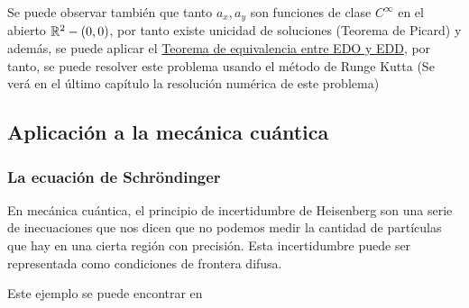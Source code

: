\begin{ejemplo}
	Se puede observar también que tanto $a_x, a_y$ son funciones de clase $C^\infty$ en el abierto $\mathbb R^2 - (0, 0)$, por tanto existe unicidad de soluciones (Teorema de Picard) y además, se puede aplicar el \hyperref[teorema:equivalencia]{Teorema de equivalencia entre EDO y EDD}, por tanto, se puede resolver este problema usando el método de Runge Kutta (Se verá en el último capítulo la resolución numérica de este problema)
	
\end{ejemplo}

\subsection{Aplicación a la mecánica cuántica}
\subsubsection{La ecuación de Schröndinger}
En mecánica cuántica, el principio de incertidumbre de Heisenberg son una serie de inecuaciones que nos dicen que no podemos medir la cantidad de partículas que hay en una cierta región con precisión. Esta incertidumbre puede ser representada como condiciones de frontera difusa. 

Este ejemplo se puede encontrar en \cite{schrondingerfuzzy}
